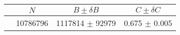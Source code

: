 \begin{tabular}{lccc}
\hline
    &   $N$   & $B \pm \delta B$  &  $C \pm \delta C$ \\
\hline
                               & 10786796   & 1117814    $\pm$ 92979 & 0.675      $\pm$ 0.005 \\
\hline
\end{tabular}
